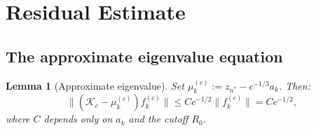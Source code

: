 \documentclass[12pt,a4paper]{amsart}
\newtheorem{lemma}[theorem]{Lemma}
\theoremstyle{definition}
\newcommand{\Kc}{\mathcal{K}_c}
\newcommand{\norm}[1]{\|#1\|}
\begin{document}
\section{Residual Estimate}
\label{sec:residual}

\subsection{The approximate eigenvalue equation}

\begin{lemma}[Approximate eigenvalue]\label{lem:approxeig}
Set $\mu_k^{(c)} := z_{n^*} - c^{-1/3}a_k$.
Then:
\begin{equation}\label{eq:approxeigbound}
  \norm{(\Kc - \mu_k^{(c)})f_k^{(c)}}
  \leq C c^{-1/2} \norm{f_k^{(c)}}
  = C c^{-1/2},
\end{equation}
where $C$ depends only on $a_k$ and the cutoff $R_0$.
\end{lemma}
\end{document}
